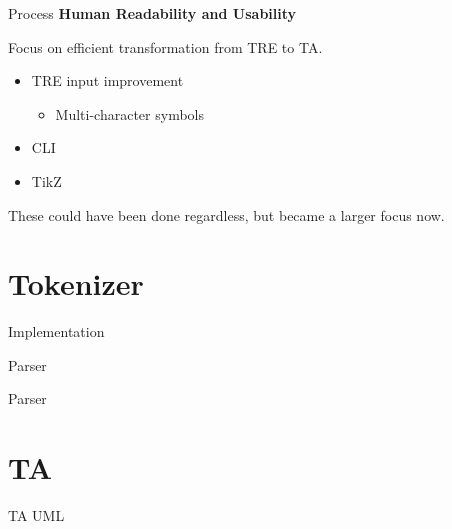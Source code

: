 \begin{frame}{Process}
    \textbf{Human Readability and Usability}

    Focus on efficient transformation from TRE to TA.
    \newline
    \begin{itemize}
        \item TRE input improvement
              \begin{itemize}
                  \item Multi-character symbols
              \end{itemize}
        \item CLI
        \item TikZ
    \end{itemize}

    These could have been done regardless, but became a larger focus now.
\end{frame}

\section{Tokenizer}

\begin{frame}[shrink=5]{Implementation}
    \begin{center}
        
    \end{center}
\end{frame}

\begin{frame}[shrink=20]{Parser}
    
\end{frame}

\begin{frame}[shrink=10]{Parser}
    \begin{center}
        
    \end{center}
\end{frame}

\section{TA}
\begin{frame}[shrink=10]{TA UML}
    \begin{center}
        
    \end{center}
\end{frame}

